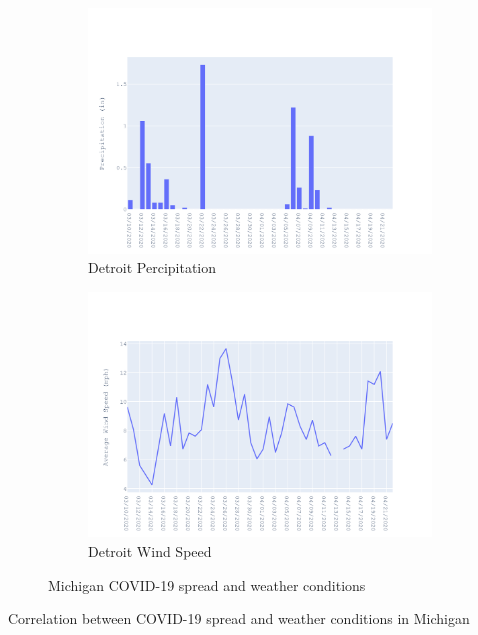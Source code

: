 \documentclass{homework}
\begin{document}
\begin{figure}[H]
  \begin{subfigure}{0.45\linewidth}
    \includegraphics[width=\linewidth]{task4/Michigan_rain.png}
    \caption{Detroit Percipitation}
  \end{subfigure}
  \hfil
  \begin{subfigure}{0.45\linewidth}
    \includegraphics[width=\linewidth]{task4/Michigan_wnd.png}
    \caption{Detroit Wind Speed}
  \end{subfigure}

  \caption{Michigan COVID-19 spread and weather conditions}
  \label{fig:task4CA}
\end{figure}

\begin{table}[H]
  \caption{Correlation between COVID-19 spread and weather conditions in Michigan}
  \label{Task 4 Michigan}
  \centering
  
\end{table}
\end{document}
